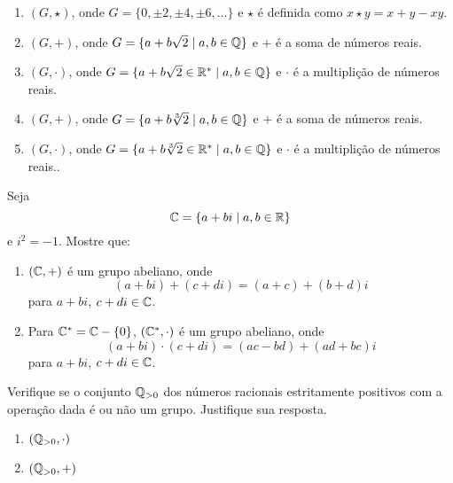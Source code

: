 \documentclass[12pt]{exam}
\begin{document}
\begin{enumerate}[label=({\alph*})]
        \item $(G, \star)$, onde $G = \{0, \pm 2, \pm 4, \pm 6, \dots\}$ e $\star$ \'e definida como $x \star y = x + y - xy$.

        \item $(G, +)$, onde $G = \{a + b\sqrt{2} \mid a, b \in \mathbb{Q}\}$ e $+$ \'e a soma de n\'umeros reais.

        \item $(G, \cdot)$, onde $G = \{a + b\sqrt{2} \in \mathbb{R}^* \mid a, b \in \mathbb{Q}\}$ e $\cdot$ \'e a multipli\c{c}\~ao de n\'umeros reais.

        \item $(G, +)$, onde $G = \{a + b\sqrt[3]{2} \mid a, b \in \mathbb{Q}\}$ e $+$ \'e a soma de n\'umeros reais.

        \item $(G, \cdot)$, onde $G = \{a + b\sqrt[3]{2} \in \mathbb{R}^* \mid a, b \in \mathbb{Q}\}$ e $\cdot$ \'e a multipli\c{c}\~ao de n\'umeros reais..
    \end{enumerate}

    \vspace{.3cm}

    \questao{} Seja
    \[
        \mathbb{C} = \{a + bi \mid a, b \in \mathbb{R}\}
    \]
    e $i^2 = -1$. Mostre que:
    \begin{enumerate}[label=({\alph*})]
        \item $(\mathbb{C}, +)$ \'e um grupo abeliano, onde
        \[
            (a + bi) + (c + di) = (a + c) + (b + d)i
        \]
        para $a + bi$, $c + di \in \mathbb{C}$.
        \item Para $\mathbb{C}^* = \mathbb{C} - \{0\}$, $(\mathbb{C}^*, \cdot)$ \'e um grupo abeliano, onde
        \[
            (a + bi)\cdot (c + di) = (ac - bd) + (ad + bc)i
        \]
        para $a + bi$, $c + di \in \mathbb{C}$.
    \end{enumerate}

    \vspace{.3cm}

    \questao{} Verifique se o conjunto $\mathbb{Q}_{>0}$ dos n{\'u}meros racionais estritamente positivos com a
     opera{\c c}{\~a}o dada {\'e} ou n{\~a}o um grupo. Justifique sua
    resposta.
    \begin{multicols}{2}
        \begin{enumerate}[label=({\alph*})]
            \item $(\mathbb{Q}_{>0},\cdot)$

            \item $(\mathbb{Q}_{>0}, +)$
        \end{enumerate}
    \end{multicols}
\end{document}
